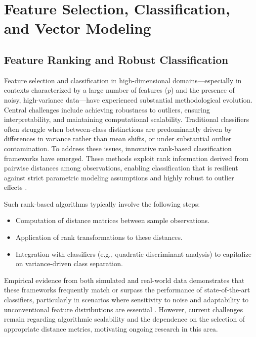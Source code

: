 \section{Feature Selection, Classification, and Vector Modeling}

\subsection{Feature Ranking and Robust Classification}

Feature selection and classification in high-dimensional domains—especially in contexts characterized by a large number of features ($p$) and the presence of noisy, high-variance data—have experienced substantial methodological evolution. Central challenges include achieving robustness to outliers, ensuring interpretability, and maintaining computational scalability. Traditional classifiers often struggle when between-class distinctions are predominantly driven by differences in variance rather than mean shifts, or under substantial outlier contamination. To address these issues, innovative rank-based classification frameworks have emerged. These methods exploit rank information derived from pairwise distances among observations, enabling classification that is resilient against strict parametric modeling assumptions and highly robust to outlier effects \cite{ref102}.

Such rank-based algorithms typically involve the following steps:

\begin{itemize}
    \item Computation of distance matrices between sample observations.
    \item Application of rank transformations to these distances.
    \item Integration with classifiers (e.g., quadratic discriminant analysis) to capitalize on variance-driven class separation.
\end{itemize}

Empirical evidence from both simulated and real-world data demonstrates that these frameworks frequently match or surpass the performance of state-of-the-art classifiers, particularly in scenarios where sensitivity to noise and adaptability to unconventional feature distributions are essential \cite{ref103}. However, current challenges remain regarding algorithmic scalability and the dependence on the selection of appropriate distance metrics, motivating ongoing research in this area.

